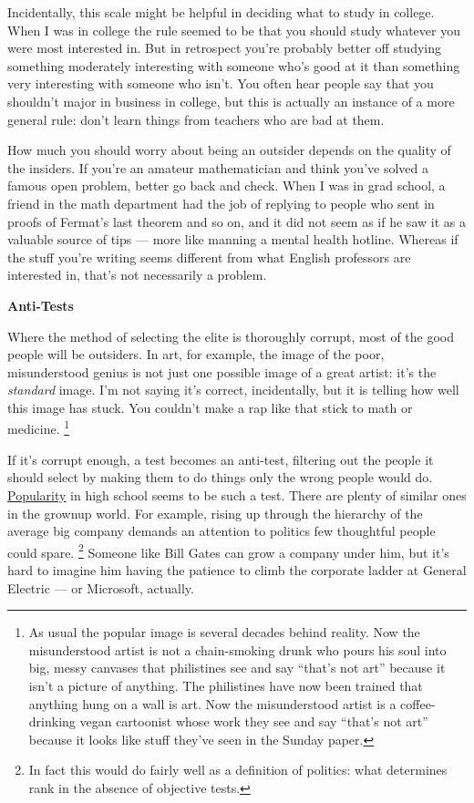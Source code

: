 \documentclass[12pt]{book}
\begin{document}
Incidentally, this scale might be helpful in deciding what to study in
college. When I was in college the rule seemed to be that you should
study whatever you were most interested in. But in retrospect you're
probably better off studying something moderately interesting with
someone who's good at it than something very interesting with someone
who isn't. You often hear people say that you shouldn't major in
business in college, but this is actually an instance of a more general
rule: don't learn things from teachers who are bad at them.

How much you should worry about being an outsider depends on the quality
of the insiders. If you're an amateur mathematician and think you've
solved a famous open problem, better go back and check. When I was in
grad school, a friend in the math department had the job of replying to
people who sent in proofs of Fermat's last theorem and so on, and it did
not seem as if he saw it as a valuable source of tips --- more like
manning a mental health hotline. Whereas if the stuff you're writing
seems different from what English professors are interested in, that's
not necessarily a problem.

\textbf{Anti-Tests}

Where the method of selecting the elite is thoroughly corrupt, most of
the good people will be outsiders. In art, for example, the image of the
poor, misunderstood genius is not just one possible image of a great
artist: it's the \emph{standard} image. I'm not saying it's correct,
incidentally, but it is telling how well this image has stuck. You
couldn't make a rap like that stick to math or medicine.
\footnote{As usual the popular image is several decades behind reality.
Now the misunderstood artist is not a chain-smoking drunk who pours his
soul into big, messy canvases that philistines see and say ``that's not
art'' because it isn't a picture of anything. The philistines have now
been trained that anything hung on a wall is art. Now the misunderstood
artist is a coffee-drinking vegan cartoonist whose work they see and say
``that's not art'' because it looks like stuff they've seen in the
Sunday paper.}

If it's corrupt enough, a test becomes an anti-test, filtering out the
people it should select by making them to do things only the wrong
people would do. \href{nerds.html}{Popularity} in high school seems to
be such a test. There are plenty of similar ones in the grownup world.
For example, rising up through the hierarchy of the average big company
demands an attention to politics few thoughtful people could spare.
\footnote{In fact this would do fairly well as a definition of politics:
what determines rank in the absence of objective tests.} Someone like Bill Gates can grow a company under
him, but it's hard to imagine him having the patience to climb the
corporate ladder at General Electric --- or Microsoft, actually.
\end{document}
